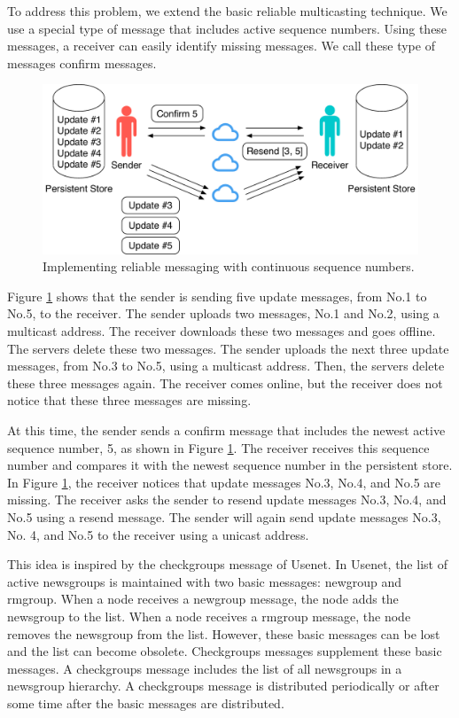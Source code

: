 \documentclass[a4paper,11pt]{report}
\begin{document}
To address this problem, we extend the basic reliable multicasting technique.
We use a special type of message that includes active sequence numbers.
Using these messages, a receiver can easily identify missing messages.
We call these type of messages confirm messages.

\begin{figure}[t]
	\centering
	\includegraphics[scale=0.6]{reliable_sync}
	\caption{Implementing reliable messaging with continuous sequence numbers.}
	\label{fig:reliable_messaging}
\end{figure}

Figure \ref{fig:reliable_messaging} shows that the sender is sending five update messages, from No.1 to No.5, to the receiver.
The sender uploads two messages, No.1 and No.2, using a multicast address.
The receiver downloads these two messages and goes offline.
The servers delete these two messages.
The sender uploads the next three update messages, from No.3 to No.5, using a multicast address.
Then, the servers delete these three messages again.
The receiver comes online, but the receiver does not notice that these three messages are missing.

At this time, the sender sends a confirm message that includes the newest active sequence number, 5, as shown in Figure \ref{fig:reliable_messaging}.
The receiver receives this sequence number and compares it with the newest sequence number in the persistent store.
In Figure \ref{fig:reliable_messaging}, the receiver notices that update messages No.3, No.4, and No.5 are missing.
The receiver asks the sender to resend update messages No.3, No.4, and No.5 using a resend message.
The sender will again send update messages No.3, No. 4, and No.5 to the receiver using a unicast address.

This idea is inspired by the checkgroups message of Usenet\cite{usenet}.
In Usenet, the list of active newsgroups is maintained with two basic messages: newgroup and rmgroup.
When a node receives a newgroup message, the node adds the newsgroup to the list.
When a node receives a rmgroup message, the node removes the newsgroup from the list.
However, these basic messages can be lost and the list can become obsolete.
Checkgroups messages supplement these basic messages.
A checkgroups message includes the list of all newsgroups in a newsgroup hierarchy.
A checkgroups message is distributed periodically or after some time after the basic messages are distributed.
\end{document}
